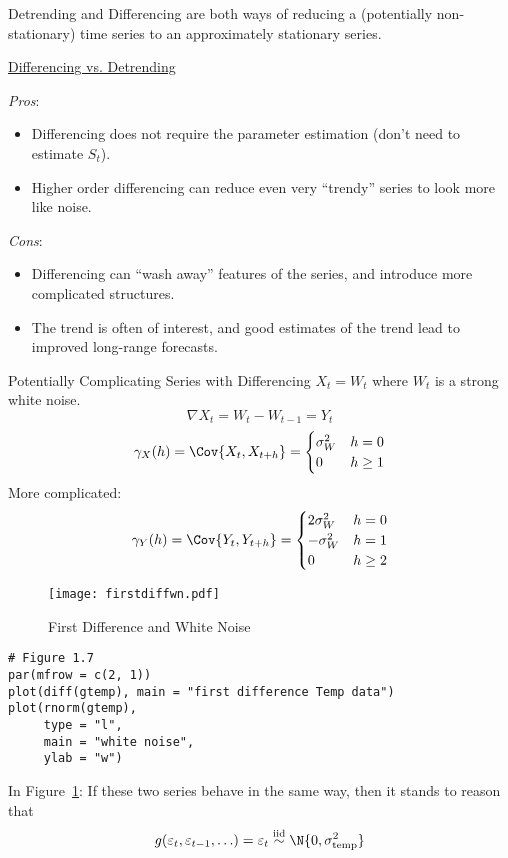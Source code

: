 Detrending and Differencing are both ways of reducing a
(potentially non-stationary) time series
to an approximately stationary series.

\underline{Differencing vs. Detrending}

\emph{Pros}:
\begin{itemize}
    \item Differencing does not require the parameter estimation
          (don't need to estimate $ S_t $).
    \item Higher order differencing can reduce even very
          ``trendy'' series to look more like noise.
\end{itemize}
\emph{Cons}:
\begin{itemize}
    \item Differencing can ``wash away'' features of the series,
          and introduce more complicated structures.
    \item The trend is often of interest, and good estimates
          of the trend lead to improved long-range forecasts.
\end{itemize}
\begin{Example}{Potentially Complicating Series with Differencing}{}
    $ X_t=W_t $ where $ W_t $ is a strong white noise.
    \[ \nabla X_t=W_t-W_{t-1}=Y_t \]
    \[ \gamma_X(h)=\Cov{X_t,X_{t+h}}=\begin{cases}
            \sigma_W^2 & h=0    \\
            0          & h\ge 1
        \end{cases} \]
    More complicated:
    \[ \gamma_Y(h)=\Cov{Y_t,Y_{t+h}}=\begin{cases}
            2\sigma_W^2 & h=0    \\
            -\sigma_W^2 & h=1    \\
            0           & h\ge 2
        \end{cases} \]
\end{Example}
\begin{figure}[!htbp]
    \centering
    \texttt{[image: firstdiffwn.pdf]}
    \caption{First Difference and White Noise}\label{fig:firstdiffwn}
\end{figure}
\begin{verbatim}
# Figure 1.7
par(mfrow = c(2, 1))
plot(diff(gtemp), main = "first difference Temp data")
plot(rnorm(gtemp),
     type = "l",
     main = "white noise",
     ylab = "w")    
\end{verbatim}
In Figure~\ref{fig:firstdiffwn}: If these two series behave in
the same way, then it stands to reason that
\[ g(\varepsilon_t,\varepsilon_{t-1},\ldots)=\varepsilon_t
    \stackrel{\text{iid}}{\sim}\N{0,\sigma^2_{\text{temp}}} \]

